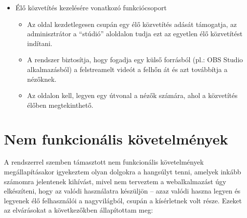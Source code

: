 \begin{itemize}
  \item Élő közvetítés kezelésére vonatkozó funkciócsoport
        \begin{itemize}
          \item Az oldal kezdetlegesen csupán egy élő közvetítés adását támogatja, az adminisztrátor a ``stúdió'' aloldalon tudja ezt az egyetlen élő közvetítést indítani.
          \item A rendszer biztosítja, hogy fogadja egy külső forrásból (pl.: OBS Studio alkalmazásból) a felstreamelt videót a felhőn át és azt továbbítja a nézőknek.
          \item Az oldalon kell, legyen egy útvonal a nézők számára, ahol a közvetítés élőben megtekinthető.
        \end{itemize}
\end{itemize}

\section{Nem funkcionális követelmények}

A rendszerrel szemben támasztott nem funkcionális követelmények megállapításakor igyekeztem olyan dolgokra a hangsúlyt tenni, amelyek inkább számomra jelentenek kihívást, mivel nem terveztem a webalkalmazást úgy elkészíteni, hogy az valódi használatra készüljön -- azaz valódi haszna legyen és legyenek élő felhasználói a nagyvilágból, csupán a kísérletnek volt része. Ezeket az elvárásokat a következőkben állapítottam meg:

